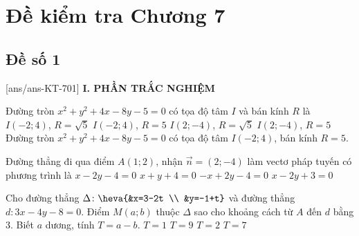 \section*{Đề kiểm tra Chương 7}
\subsection*{Đề số 1}
\setcounter{ex}{0}\setcounter{bt}{0}
[ans/ans-KT-701]
\noindent\textbf{I. PHẦN TRẮC NGHIỆM}
\begin{ex}%
	Đường tròn $x^2 + y^2 + 4x- 8y - 5 = 0$ có tọa độ tâm $I$ và bán kính $R$ là
	\choice
	{$I(-2;4)$, $R = \sqrt{5}$}
	{\True $I(-2;4)$, $R = 5$}
	{$I(2;-4)$, $R = \sqrt{5}$}
	{$I(2;-4)$, $R = 5$}
	\loigiai
	{
		Đường tròn $x^2 + y^2 + 4x- 8y - 5 = 0$ có tọa độ tâm $I(-2;4)$, bán kính $R = 5$.
	}
\end{ex}

\begin{ex}%
	Đường thẳng đi qua điểm $A(1; 2)$, nhận $\vec{n}=(2;-4)$ làm vectơ pháp tuyến có phương trình là
	\choice
	{$x-2y-4=0$}
	{$x+y+4=0$}
	{$-x+2y-4=0$}
	{\True $x-2y+3=0$}
\end{ex}	
	
	\begin{ex}%
		Cho đường thẳng $\Delta\colon\heva{&x=3-2t \\ &y=-1+t}$ và đường thẳng $d\colon 3x-4y-8=0$. Điểm $M(a;b)$ thuộc $\Delta$ sao cho khoảng cách từ $A$ đến $d$ bằng $3$. Biết $a$ dương, tính $T=a-b$.
		\choice
		{$T=1$}
		{$T=9$}
		{$T=2$}
		{\True $T=7$}
	\end{ex}	
	
